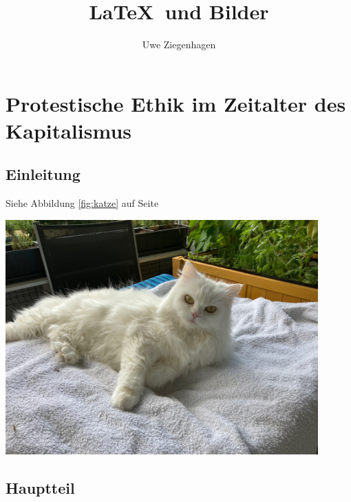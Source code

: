 \documentclass[12pt,ngerman,parskip=half]{scrreprt}
\author{Uwe Ziegenhagen}
\title{\LaTeX\ und Bilder}
\begin{document}
\maketitle


\tableofcontents

\listoffigures

\listoftables

\chapter{Protestische Ethik im Zeitalter des Kapitalismus}

\section{Einleitung}

Siehe Abbildung \ref{fig:katze} auf Seite \pageref{fig:katze}

\blindtext[2]

\includegraphics[width=12cm]{Bilder/Katze1}

\blindtext[2]

\section{Hauptteil}\label{sec:hauptteil}

\blindtext[2]
\end{document}

